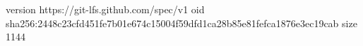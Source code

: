 version https://git-lfs.github.com/spec/v1
oid sha256:2448c23cfd451fe7b01e674c15004f59dfd1ca28b85e81fefca1876e3ec19cab
size 1144
